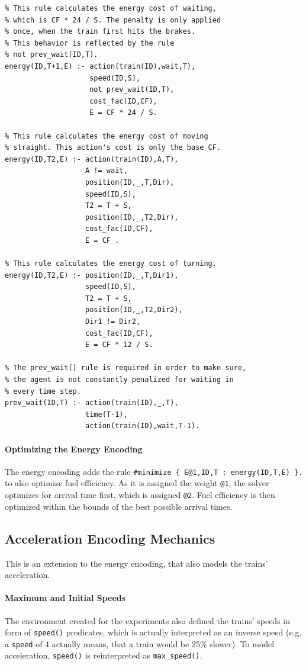 \documentclass[12pt, a4paper]{llncs}
\begin{document}
\begin{verbatim}
% This rule calculates the energy cost of waiting,
% which is CF * 24 / S. The penalty is only applied 
% once, when the train first hits the brakes.
% This behavior is reflected by the rule
% not prev_wait(ID,T).
energy(ID,T+1,E) :- action(train(ID),wait,T),
                    speed(ID,S),
                    not prev_wait(ID,T),
                    cost_fac(ID,CF),
                    E = CF * 24 / S.

% This rule calculates the energy cost of moving
% straight. This action's cost is only the base CF.
energy(ID,T2,E) :- action(train(ID),A,T),
                   A != wait,
                   position(ID,_,T,Dir),
                   speed(ID,S),
                   T2 = T + S,
                   position(ID,_,T2,Dir),
                   cost_fac(ID,CF),
                   E = CF .

% This rule calculates the energy cost of turning.
energy(ID,T2,E) :- position(ID,_,T,Dir1),
                   speed(ID,S),
                   T2 = T + S,
                   position(ID,_,T2,Dir2),
                   Dir1 != Dir2,
                   cost_fac(ID,CF),
                   E = CF * 12 / S.
                   
% The prev_wait() rule is required in order to make sure,
% the agent is not constantly penalized for waiting in
% every time step.
prev_wait(ID,T) :- action(train(ID),_,T), 
                   time(T-1),
                   action(train(ID),wait,T-1).
\end{verbatim}

\paragraph{Optimizing the Energy Encoding}
The energy encoding adds the rule \texttt{\#minimize \{ E@1,ID,T : energy(ID,T,E) \}.} to also optimize fuel efficiency. As it is assigned the weight \texttt{@1}, the solver optimizes for arrival time first, which is assigned \texttt{@2}. Fuel efficiency is then optimized within the bounds of the best possible arrival times. 

\subsection{Acceleration Encoding Mechanics}
This is an extension to the energy encoding, that also models the trains' acceleration.

\paragraph{Maximum and Initial Speeds}
The environment created for the experiments also defined the trains' speeds in form of \texttt{speed()} predicates, which is actually interpreted as an inverse speed (e.g. a \texttt{speed} of 4 actually means, that a train would be 25\% slower). To model acceleration, \texttt{speed()} is reinterpreted as \texttt{max\_speed()}.
\end{document}
